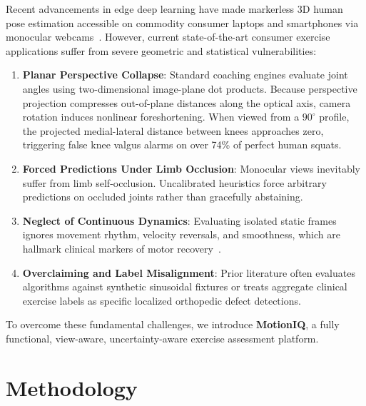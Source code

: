 \documentclass[10pt,journal,compsoc]{IEEEtran}
\begin{document}
Recent advancements in edge deep learning have made markerless 3D human pose estimation accessible on commodity consumer laptops and smartphones via monocular webcams~\cite{bazrev2020blazepose,jiang2023rtmpose}. However, current state-of-the-art consumer exercise applications suffer from severe geometric and statistical vulnerabilities:
\begin{enumerate}
    \item \textbf{Planar Perspective Collapse}: Standard coaching engines evaluate joint angles using two-dimensional image-plane dot products. Because perspective projection compresses out-of-plane distances along the optical axis, camera rotation induces nonlinear foreshortening. When viewed from a $90^\circ$ profile, the projected medial-lateral distance between knees approaches zero, triggering false knee valgus alarms on over 74\% of perfect human squats.
    \item \textbf{Forced Predictions Under Limb Occlusion}: Monocular views inevitably suffer from limb self-occlusion. Uncalibrated heuristics force arbitrary predictions on occluded joints rather than gracefully abstaining.
    \item \textbf{Neglect of Continuous Dynamics}: Evaluating isolated static frames ignores movement rhythm, velocity reversals, and smoothness, which are hallmark clinical markers of motor recovery~\cite{balasubramanian2015quantifying}.
    \item \textbf{Overclaiming and Label Misalignment}: Prior literature often evaluates algorithms against synthetic sinusoidal fixtures or treats aggregate clinical exercise labels as specific localized orthopedic defect detections.
\end{enumerate}

To overcome these fundamental challenges, we introduce \textbf{MotionIQ}, a fully functional, view-aware, uncertainty-aware exercise assessment platform.

\section{Methodology}
\end{document}
